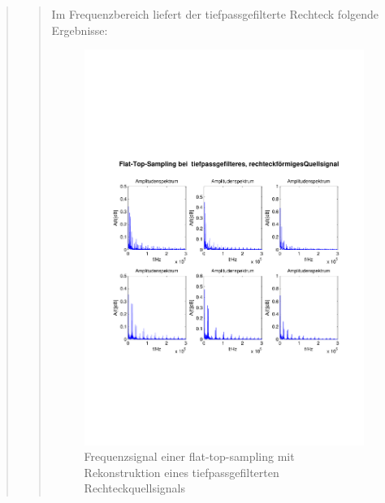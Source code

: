 \begin{quote}
\begin{quote}
      	    Im Frequenzbereich liefert der tiefpassgefilterte Rechteck folgende
      	    Ergebnisse:
      	    
      	    \begin{figure}[H]
            \centering
            \includegraphics[scale=0.6, trim = 1.5cm 6cm 1cm 8cm,
            clip]{./Bilder/flat-top-tp-recht_freq}
                \caption{Frequenzsignal einer flat-top-sampling mit
                Rekonstruktion eines tiefpassgefilterten Rechteckquellsignals}
      	    \end{figure}
      	    
        \end{quote}  %
       	

\end{quote}
